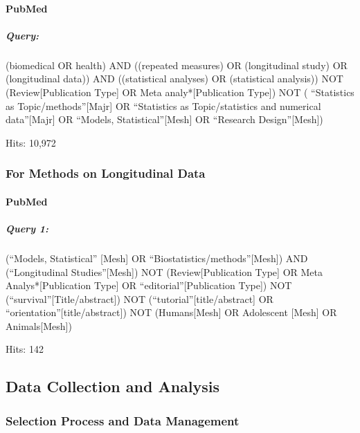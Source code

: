 \documentclass[
]{article}
\let\oldparagraph\paragraph
\renewcommand{\paragraph}[1]{\oldparagraph{#1}\mbox{}}
\let\oldsubparagraph\subparagraph
\renewcommand{\subparagraph}[1]{\oldsubparagraph{#1}\mbox{}}
\begin{document}
\hypertarget{pubmed}{%
\paragraph{PubMed}\label{pubmed}}

\hypertarget{query}{%
\subparagraph{Query:}\label{query}}

(biomedical OR health) AND ((repeated measures) OR (longitudinal study)
OR (longitudinal data)) AND ((statistical analyses) OR (statistical
analysis)) NOT (Review{[}Publication Type{]} OR Meta
analy*{[}Publication Type{]}) NOT ( ``Statistics as
Topic/methods''{[}Majr{]} OR ``Statistics as Topic/statistics and
numerical data''{[}Majr{]} OR ``Models, Statistical''{[}Mesh{]} OR
``Research Design''{[}Mesh{]})

Hits: 10,972

\hypertarget{for-methods-on-longitudinal-data}{%
\subsubsection{For Methods on Longitudinal
Data}\label{for-methods-on-longitudinal-data}}

\hypertarget{pubmed-1}{%
\paragraph{PubMed}\label{pubmed-1}}

\hypertarget{query-1}{%
\subparagraph{Query 1:}\label{query-1}}

(``Models, Statistical'' {[}Mesh{]} OR
``Biostatistics/methods''{[}Mesh{]}) AND (``Longitudinal
Studies''{[}Mesh{]}) NOT (Review{[}Publication Type{]} OR Meta
Analys*{[}Publication Type{]} OR ``editorial''{[}Publication Type{]})
NOT (``survival''{[}Title/abstract{]}) NOT
(``tutorial''{[}title/abstract{]} OR
``orientation''{[}title/abstract{]}) NOT (Humans{[}Mesh{]} OR Adolescent
{[}Mesh{]} OR Animals{[}Mesh{]})

Hits: 142

\hypertarget{data-collection-and-analysis}{%
\subsection{Data Collection and
Analysis}\label{data-collection-and-analysis}}

\hypertarget{selection-process-and-data-management}{%
\subsubsection{Selection Process and Data
Management}\label{selection-process-and-data-management}}
\end{document}
